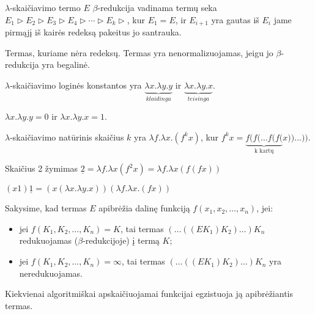 \begin{defn}
  $\lambda$-skaičiavimo termo $E$ $\beta$-redukcija vadinama termų seka
  $E_1 \triangleright E_2 \triangleright E_3 \triangleright %
  E_4 \triangleright \cdots \triangleright E_k \triangleright$, kur
  $E_1 = E$, ir $E_{i+1}$ yra gautas iš $E_{i}$ jame pirmąjį iš kairės 
  redeksą pakeitus jo santrauka.
\end{defn}

\begin{defn}
  Termas, kuriame nėra redeksų. Termas yra nenormalizuojamas, jeigu jo 
  $\beta$-redukcija yra begalinė.
\end{defn}

\begin{defn}
  $\lambda$-skaičiavimo loginės konstantos yra 
  $\underbrace{\lambda x.\lambda y.y}_{klaidinga}$ ir 
  $\underbrace{\lambda x.\lambda y.x}_{teisinga}$.
  \begin{notation}
    $\lambda x.\lambda y.y = 0$ ir $\lambda x.\lambda y.x = 1$.
  \end{notation}
\end{defn}

\begin{defn}
  $\lambda$-skaičiavimo natūrinis skaičius $k$ yra 
  $\lambda f.\lambda x.(f^{k} x)$, kur
  $f^{k} x = \underbrace{f(f(\dots f(f(}_{\text{k kartų}} x ))\dots))$.
  \begin{notation}
    Skaičius 2 žymimas 
    $\underline{2} = \lambda f.\lambda x(f^{2} x) =%
    \lambda f.\lambda x(f(fx))$
  \end{notation}
\end{defn}

\begin{exmp}
  $(x1)\underline{1} = (x(\lambda x.\lambda y.x))(\lambda f.\lambda x.(fx))$
\end{exmp}

\begin{defn}
  Sakysime, kad termas $E$ apibrėžia dalinę funkciją 
  $f(x_1,x_2,\dotsc,x_n)$, jei:
  \begin{itemize}
    \item jei $f(K_1,K_2,\dotsc,K_n) = K$, tai termas 
      $(\dots((EK_1)K_2)\dots)K_n$ redukuojamas ($\beta$-redukcijoje) į
      termą $K$;
    \item jei $f(K_1,K_2,\dotsc,K_n) = \infty$, tai termas 
      $(\dots((EK_1)K_2)\dots)K_n$ yra neredukuojamas.
  \end{itemize}
\end{defn}

\begin{prop}
  Kiekvienai algoritmiškai apskaičiuojamai funkcijai egzistuoja ją 
  apibrėžiantis termas.
\end{prop}


